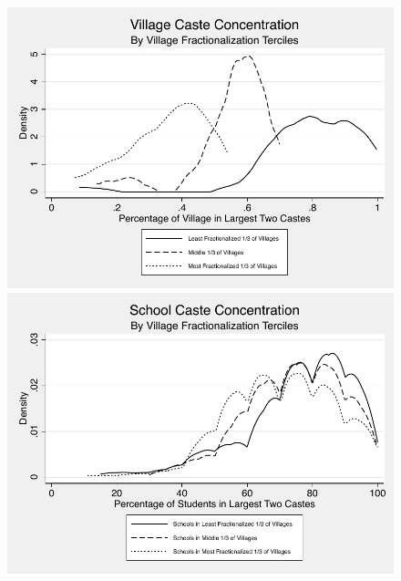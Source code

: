 \documentclass{beamer}
\begin{document}
\begin{frame}{}
	\begin{figure}[htb]
		\begin{center}
		\includegraphics[scale=0.4]{graphs/village_toptwo.pdf}
		\pause \\
		\includegraphics[scale=0.4]{graphs/school_toptwo.pdf}
		\end{center}
	\end{figure}
\end{frame}
\end{document}
